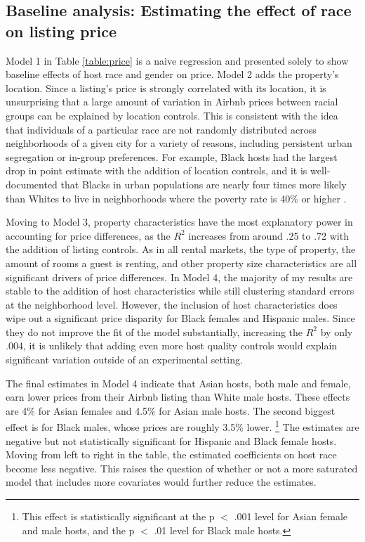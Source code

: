 \label{result1}
	
\subsection{Baseline analysis: Estimating the effect of race on listing price}

Model 1 in Table \ref{table:price} is a naive regression and presented solely to show baseline effects of host race and gender on price. Model 2 adds the property's location. Since a listing's price is strongly correlated with its location, it is unsurprising that a large amount of variation in Airbnb prices between racial groups can be explained by location controls. This is consistent with the idea that individuals of a particular race are not randomly distributed across neighborhoods of a given city for a variety of reasons, including persistent urban segregation or in-group preferences. For example, Black hosts had the largest drop in point estimate with the addition of location controls, and it is well-documented that Blacks in urban populations are nearly four times more likely than Whites to live in neighborhoods where the poverty rate is 40\% or higher \citep{firebaugh}. 

Moving to Model 3, property characteristics have the most explanatory power in accounting for price differences, as the $R^2$ increases from around .25 to .72 with the addition of listing controls. As in all rental markets, the type of property, the amount of rooms a guest is renting, and other property size characteristics are all significant drivers of price differences. In Model 4, the majority of my results are stable to the addition of host characteristics while still clustering standard errors at the neighborhood level. However, the inclusion of host characteristics does wipe out a significant price disparity for Black females and Hispanic males. Since they do not improve the fit of the model substantially, increasing the $R^2$ by only .004, it is unlikely that adding even more host quality controls would explain significant variation outside of an experimental setting. 

The final estimates in Model 4 indicate that Asian hosts, both male and female, earn lower prices from their Airbnb listing than White male hosts. These effects are 4\% for Asian females and 4.5\% for Asian male hosts. The second biggest effect is for Black males, whose prices are roughly 3.5\% lower.%
	\footnote{This effect is statistically significant at the p $<$ .001 level for Asian female and male hosts, and the p $<$ .01 level for Black male hosts.} 
The estimates are negative but not statistically significant for Hispanic and Black female hosts. Moving from left to right in the table, the estimated coefficients on host race become less negative. This raises the question of whether or not a more saturated model that includes more covariates would further reduce the estimates. 

